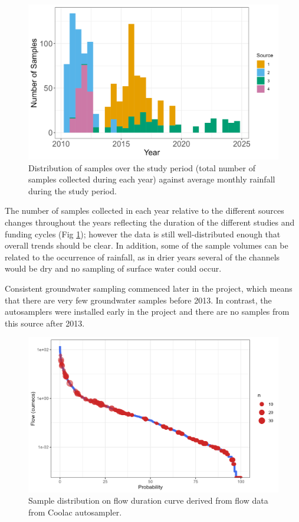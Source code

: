 \documentclass[, manuscript]{copernicus}
\begin{document}
\begin{figure}
\includegraphics[width=0.5\linewidth]{Figures/annual} \caption{Distribution of samples over the study period (total number of samples collected during each year) against average monthly rainfall during the study period. }\label{fig:annual-plot}
\end{figure}
\clearpage

The number of samples collected in each year relative to the different
sources changes throughout the years reflecting the duration of the
different studies and funding cycles (Fig \ref{fig:annual-plot});
however the data is still well-distributed enough that overall trends
should be clear. In addition, some of the sample volumes can be related
to the occurrence of rainfall, as in drier years several of the channels
would be dry and no sampling of surface water could occur.

Consistent groundwater sampling commenced later in the project, which
means that there are very few groundwater samples before 2013. In
contrast, the autosamplers were installed early in the project and there
are no samples from this source after 2013.

\begin{figure}
\includegraphics[width=0.8\linewidth]{Figures/FDC} \caption{Sample distribution on flow duration curve derived from flow data from Coolac autosampler.}\label{fig:FDC}
\end{figure}
\end{document}
